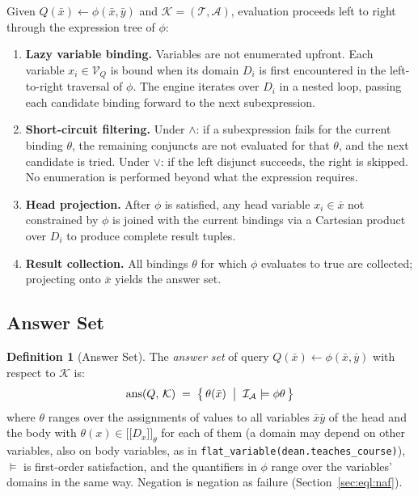 \documentclass[11pt, a4paper]{article}
\newcommand{\llbracket}{\mathopen{[\![}}
\newcommand{\rrbracket}{\mathclose{]\!]}}
\theoremstyle{plain}
\theoremstyle{definition}
\newtheorem{definition}[theorem]{Definition}
\theoremstyle{remark}
\begin{document}
Given $Q(\bar{x}) \leftarrow \phi(\bar{x}, \bar{y})$ and $\mathcal{K} = (\mathcal{T},
\mathcal{A})$, evaluation proceeds left to right through the expression tree of $\phi$:

\begin{enumerate}
  \item \textbf{Lazy variable binding.}  Variables are not enumerated upfront.  Each variable
        $x_i \in \mathcal{V}_Q$ is bound when its domain $D_i$ is first encountered in the
        left-to-right traversal of $\phi$.  The engine iterates over $D_i$ in a nested loop,
        passing each candidate binding forward to the next subexpression.

  \item \textbf{Short-circuit filtering.}  Under $\wedge$: if a subexpression fails for the
        current binding $\theta$, the remaining conjuncts are not evaluated for that $\theta$,
        and the next candidate is tried.  Under $\vee$: if the left disjunct succeeds, the
        right is skipped.  No enumeration is performed beyond what the expression requires.

  \item \textbf{Head projection.}  After $\phi$ is satisfied, any head variable $x_i \in
        \bar{x}$ not constrained by $\phi$ is joined with the current bindings via a Cartesian
        product over $D_i$ to produce complete result tuples.

  \item \textbf{Result collection.}  All bindings $\theta$ for which $\phi$ evaluates to true
        are collected; projecting onto $\bar{x}$ yields the answer set.
\end{enumerate}

\subsection{Answer Set}

\begin{definition}[Answer Set]
\label{def:ans}
The \emph{answer set} of query $Q(\bar{x}) \leftarrow \phi(\bar{x}, \bar{y})$ with respect to
$\mathcal{K}$ is:
\[
  \mathrm{ans}(Q,\,\mathcal{K})
  \;=\;
  \bigl\{\,\theta(\bar{x})
    \;\bigm|\;
    \mathcal{I}_{\mathcal{A}} \models \phi\theta
  \,\bigr\}
\]
where $\theta$ ranges over the assignments of values to all variables $\bar{x}\bar{y}$ of the
head and the body with $\theta(x) \in \llbracket D_x \rrbracket_\theta$ for each of them (a domain
may depend on other variables, also on body variables, as in
\texttt{flat\_variable(dean.teaches\_course)}), $\models$ is first-order satisfaction, and the
quantifiers in $\phi$ range over the variables' domains in the same way.  Negation is
negation as failure (Section~\ref{sec:eql:naf}).
\end{definition}
\end{document}
